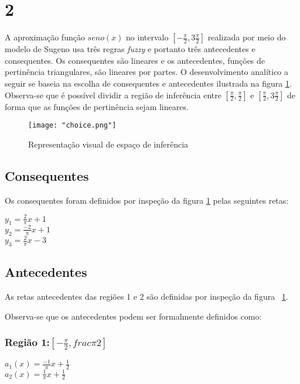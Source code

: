 \documentclass{article}
\begin{document}
\section{2}

A aproximação função $seno(x)$ no intervalo $[-\frac{\pi}{2}, 3 \frac{\pi}{2}]$
realizada por meio do modelo de Sugeno usa três regras \emph{fuzzy} e portanto
três antecedentes e consequentes. Os consequentes são lineares e os
antecedentes, funções de pertinência triangulares, são lineares por partes. O
desenvolvimento analítico a seguir se baseia na escolha de consequentes e
antecedentes ilustrada na figura \ref{fig:choice}. Observa-se que é possível
dividir a região de inferência entre $[\frac{\pi}{2}, \frac{\pi}{2}]$ e
$[\frac{\pi}{2}, 3 \frac{\pi}{2}]$ de forma que as funções de pertinência sejam
lineares.

\begin{figure}
    \centering
    \texttt{[image: "choice.png"]}
    \caption{Representação visual de espaço de inferência}
    \label{fig:choice}
\end{figure}

\subsection{Consequentes}

Os consequentes foram definidos por inspeção da figura \ref{fig:choice} pelas
seguintes retas:

$y_1 = \frac{2}{\pi}x + 1$  \\
$y_2 = \frac{-2}{\pi}x + 1$ \\
$y_3 = \frac{2}{\pi}x - 3$ \\

\subsection{Antecedentes}

As retas antecedentes das regiões 1 e 2 são definidas por inspeção da figura
~\ref{fig:choice}.

Observa-se que os antecedentes podem ser formalmente definidos como:

\subsubsection{Região 1:$[-\frac{\pi}{2}, frac{\pi}{2}]$}

$a_1(x) = \frac{-1}{\pi}x + \frac{1}{2}$ \\
$a_2(x) = \frac{1}{\pi}x + \frac{1}{2}$\\
\end{document}
